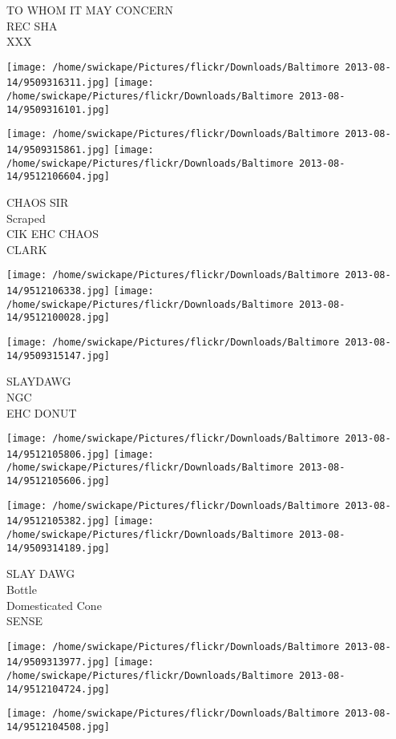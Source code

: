 \documentclass[10pt,letterpaper]{article}
\begin{document}
TO WHOM IT MAY CONCERN\\
REC SHA\\
XXX
\pagebreak

\texttt{[image: /home/swickape/Pictures/flickr/Downloads/Baltimore 2013-08-14/9509316311.jpg]}
\texttt{[image: /home/swickape/Pictures/flickr/Downloads/Baltimore 2013-08-14/9509316101.jpg]}

\texttt{[image: /home/swickape/Pictures/flickr/Downloads/Baltimore 2013-08-14/9509315861.jpg]}
\texttt{[image: /home/swickape/Pictures/flickr/Downloads/Baltimore 2013-08-14/9512106604.jpg]}

CHAOS SIR\\
Scraped\\
CIK EHC CHAOS\\
CLARK
\pagebreak

\texttt{[image: /home/swickape/Pictures/flickr/Downloads/Baltimore 2013-08-14/9512106338.jpg]}
\texttt{[image: /home/swickape/Pictures/flickr/Downloads/Baltimore 2013-08-14/9512100028.jpg]}

\vspace{0.25in}
\texttt{[image: /home/swickape/Pictures/flickr/Downloads/Baltimore 2013-08-14/9509315147.jpg]}

SLAYDAWG\\
NGC\\
EHC DONUT
\pagebreak

\texttt{[image: /home/swickape/Pictures/flickr/Downloads/Baltimore 2013-08-14/9512105806.jpg]}
\texttt{[image: /home/swickape/Pictures/flickr/Downloads/Baltimore 2013-08-14/9512105606.jpg]}

\texttt{[image: /home/swickape/Pictures/flickr/Downloads/Baltimore 2013-08-14/9512105382.jpg]}
\texttt{[image: /home/swickape/Pictures/flickr/Downloads/Baltimore 2013-08-14/9509314189.jpg]}

SLAY DAWG\\
Bottle\\
Domesticated Cone\\
SENSE
\pagebreak

\texttt{[image: /home/swickape/Pictures/flickr/Downloads/Baltimore 2013-08-14/9509313977.jpg]}
\texttt{[image: /home/swickape/Pictures/flickr/Downloads/Baltimore 2013-08-14/9512104724.jpg]}

\vspace{0.25in}
\texttt{[image: /home/swickape/Pictures/flickr/Downloads/Baltimore 2013-08-14/9512104508.jpg]}
\end{document}
